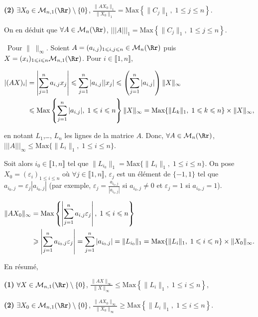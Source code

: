 {{\textbf{(2)} $\exists X_0\in\mathcal{M}_{n,1}(\Rr)\setminus\{0\}$, $ \frac{\|AX_0\|_1}{\|X_0\|_1}=\text{Max}\left\{\|C_j\|_1,\;1\leqslant j\leqslant n\right\}$.

On en déduit que $\forall A\in\mathcal{M}_n(\Rr)$, $|||A|||_1=\text{Max}\left\{\|C_j\|_1,\;1\leqslant j\leqslant n\right\}$.

\textbullet~Pour $\|\;\|_\infty$. Soient $A=(a_{i,j})_{1\leqslant i,j\leqslant n}\in\mathcal{M}_n(\Rr)$ puis $X=(x_i)_{1\leqslant i\leqslant n}\mathcal{M}_{n,1}(\Rr)$. Pour $i\in\llbracket1,n\rrbracket$,

\begin{align*}\ensuremath
|(AX)_i|&=\left|\sum_{j=1}^{n}a_{i,j}x_j\right|\leqslant\sum_{j=1}^{n}|a_{i,j}||x_j|\leqslant\left(\sum_{j=1}^{n}|a_{i,j}|\right)\|X\|_\infty\\
 &\leqslant\text{Max}\left\{\sum_{j=1}^{n}|a_{i,j}|,\;1\leqslant i\leqslant n\right\}\|X\|_\infty=\text{Max}\{\|L_k\|_1,\;1\leqslant k\leqslant n\}\times\|X\|_\infty,
\end{align*}

en notant $L_1$,\ldots, $L_n$ les lignes de la matrice $A$. Donc, $\forall A\in\mathcal{M}_n(\Rr)$, $|||A|||_\infty\leqslant\text{Max}\{\|L_i\|_1,\;1\leqslant i\leqslant n\}$.

Soit alors $i_0\in\llbracket1,n\rrbracket$ tel que $\|L_{i_0}\|_1=\text{Max}\{\|L_i\|_1,\;1\leqslant i\leqslant n\}$. On pose $X_{0}=\left(\varepsilon_i\right)_{1\leqslant i\leqslant n}$ où $\forall j\in\llbracket 1,n\rrbracket$, $\varepsilon_j$ est un élément de $\{-1,1\}$ tel que $a_{i_0,j}=\varepsilon_j|a_{i_0,j}|$ (par exemple, $\varepsilon_j= \frac{a_{i_0,j}}{|a_{i_0,j}|}$ si $a_{i_0,j}\neq0$ et $\varepsilon_j=1$ si $a_{i_0,j}=1$).

\begin{align*}\ensuremath
\|AX_0\|_\infty&=\text{Max}\left\{\left|\sum_{j=1}^{n}a_{i,j}\varepsilon_j\right|,\;1\leqslant i\leqslant n\right\}\\
 &\geqslant\left|\sum_{j=1}^{n}a_{i_0,j}\varepsilon_j\right|=\sum_{j=1}^{n}|a_{i_0,j}|=\|L_{i_0}\|_1
=\text{Max}\{\|L_i\|_1,\;1\leqslant i\leqslant n\}\times\|X_0\|_\infty.
\end{align*}

En résumé,

\textbf{(1)} $\forall X\in\mathcal{M}_{n,1}(\Rr)\setminus\{0\}$, $ \frac{\|AX\|_\infty}{\|X\|_\infty}\leqslant\text{Max}\left\{\|L_i\|_1,\;1\leqslant i\leqslant n\right\}$,

\textbf{(2)} $\exists X_0\in\mathcal{M}_{n,1}(\Rr)\setminus\{0\}$, $ \frac{\|AX_0\|_\infty}{\|X_0\|_\infty}\geqslant\text{Max}\left\{\|L_i\|_1,\;1\leqslant i\leqslant n\right\}$.

}}
